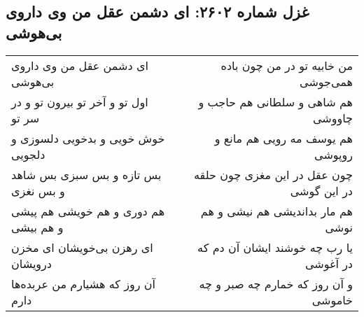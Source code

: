 \begin{center}
\section*{غزل شماره ۲۶۰۲: ای دشمن عقل من وی داروی بی‌هوشی}
\label{sec:2602}
\begin{longtable}{l p{0.5cm} r}
ای دشمن عقل من وی داروی بی‌هوشی
&&
من خابیه تو در من چون باده همی‌جوشی
\\
اول تو و آخر تو بیرون تو و در سر تو
&&
هم شاهی و سلطانی هم حاجب و چاووشی
\\
خوش خویی و بدخویی دلسوزی و دلجویی
&&
هم یوسف مه رویی هم مانع و روپوشی
\\
بس تازه و بس سبزی بس شاهد و بس نغزی
&&
چون عقل در این مغزی چون حلقه در این گوشی
\\
هم دوری و هم خویشی هم پیشی و هم بیشی
&&
هم مار بداندیشی هم نیشی و هم نوشی
\\
ای رهزن بی‌خویشان ای مخزن درویشان
&&
یا رب چه خوشند ایشان آن دم که در آغوشی
\\
آن روز که هشیارم من عربده‌ها دارم
&&
و آن روز که خمارم چه صبر و چه خاموشی
\\
\end{longtable}
\end{center}
